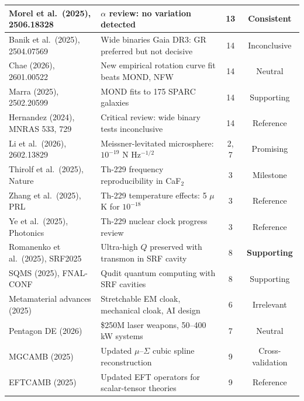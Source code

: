 \documentclass[11pt]{article}
\begin{document}
\begin{longtable}{>{\raggedright}p{3cm}p{5cm}cc}
Morel et al.\ (2025), 2506.18328 &
$\alpha$ review: no variation detected &
13 &
Consistent \\

\midrule

Banik et al.\ (2025), 2504.07569 &
Wide binaries Gaia DR3: GR preferred but not decisive &
14 &
Inconclusive \\

Chae (2026), 2601.00522 &
New empirical rotation curve fit beats MOND, NFW &
14 &
Neutral \\

Marra (2025), 2502.20599 &
MOND fits to 175 SPARC galaxies &
14 &
Supporting \\

Hernandez (2024), MNRAS 533, 729 &
Critical review: wide binary tests inconclusive &
14 &
Reference \\

\midrule

Li et al.\ (2026), 2602.13829 &
Meissner-levitated microsphere: $10^{-19}$ N Hz$^{-1/2}$ &
2, 7 &
Promising \\

Thirolf et al.\ (2025), Nature &
Th-229 frequency reproducibility in CaF$_2$ &
3 &
Milestone \\

Zhang et al.\ (2025), PRL &
Th-229 temperature effects: 5 $\mu$K for $10^{-18}$ &
3 &
Reference \\

Ye et al.\ (2025), Photonics &
Th-229 nuclear clock progress review &
3 &
Reference \\

\midrule

Romanenko et al.\ (2025), SRF2025 &
Ultra-high $Q$ preserved with transmon in SRF cavity &
8 &
\textbf{Supporting} \\

SQMS (2025), FNAL-CONF &
Qudit quantum computing with SRF cavities &
8 &
Supporting \\

Metamaterial advances (2025) &
Stretchable EM cloak, mechanical cloak, AI design &
6 &
Irrelevant \\

Pentagon DE (2026) &
\$250M laser weapons, 50--400 kW systems &
7 &
Neutral \\

MGCAMB (2025) &
Updated $\mu$--$\Sigma$ cubic spline reconstruction &
9 &
Cross-validation \\

EFTCAMB (2025) &
Updated EFT operators for scalar-tensor theories &
9 &
Reference \\

\bottomrule
\end{longtable}
\end{document}
